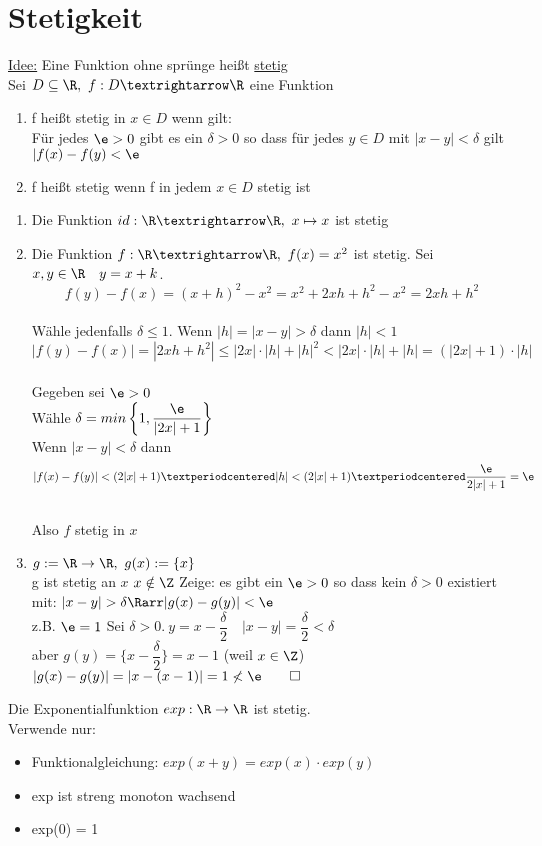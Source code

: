 \chapter{Stetigkeit}
\underline{Idee:} Eine Funktion ohne sprünge heißt \underline{stetig}\\
Sei $D\subseteq \R,\ f:D→\R$ eine Funktion\\
\begin{enumerate}
\item{f heißt stetig in $x\in D$ wenn gilt:\\
Für jedes $\e>0$ gibt es ein $\delta>0$ so dass für jedes $y\in D$ mit $|x-y|<\delta$ gilt $|f(x)-f(y)<\e$ %
}
\item{f heißt stetig wenn f in jedem $x\in D$ stetig ist}
\end{enumerate}
\begin{enumerate}
\item{Die Funktion $id:\R→\R,\ x\mapsto x$ ist stetig}
\item{Die Funktion $f:\R→\R,\ f(x)=x^2$ ist stetig. %
\bew
Sei $x,y\in\R\quad y=x+k$.\\
$$f(y)-f(x)=(x+h)^2-x^2=x^2+2xh+h^2-x^2=2xh+h^2$$\\
Wähle jedenfalls $\delta\leq 1$. Wenn $|h|=|x-y|>\delta$ dann $|h|<1$\\
$$|f(y)-f(x)|=|2xh+h^2|\leq|2x|·|h|+|h|^2<|2x|·|h|+|h|=(|2x|+1)·|h|$$\\
Gegeben sei $\e>0$\\
Wähle $\delta=min\left\{1,\dfrac{\e}{|2x|+1}\right\}$\\
Wenn $|x-y|<\delta$ dann $$|f(x)-f(y)|<(2|x|+1)·|h|<(2|x|+1)·\dfrac{\e}{2|x|+1}=\e$$\\
Also $f$ stetig in $x$}
\item{$g:=\R \to \R,\ g(x):=\{x\}$\\
g ist stetig an $x$ \equ $x\notin\Z$
Zeige: es gibt ein $\e>0$ so dass kein $\delta>0$ existiert mit: $|x-y|>\delta\Rarr|g(x)-g(y)|<\e$\\
z.B. $\e=1$ Sei $\delta>0.\ y=x-\dfrac{\delta}{2}\quad |x-y|=\dfrac{\delta}{2}<\delta$\\
aber $g(y)=\{x-\dfrac{\delta}{2}\}=x-1$ (weil $x\in\Z$)\\
$|g(x)-g(y)|=|x-(x-1)|=1 \not<\e\qed$}
\end{enumerate}
%
Die Exponentialfunktion $exp: \R \to \R$ ist stetig.\\
\bew
Verwende nur:
\begin{itemize}
\item{Funktionalgleichung: $exp(x + y) = exp(x) \cdot exp(y)$}
\item{exp ist streng monoton wachsend}
\item{exp(0) = 1}
\end{itemize}
